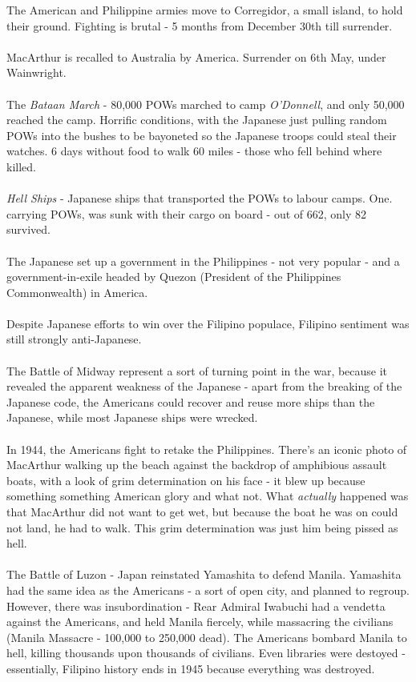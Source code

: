 \documentclass[a4paper]{article}
\begin{document}
\noindent The American and Philippine armies move to Corregidor, a small island, to hold their ground. Fighting is brutal - 5 months from December 30th till surrender.\\
\\
MacArthur is recalled to Australia by America. Surrender on 6th May, under Wainwright.\\
\\
The \textit{Bataan March} - 80,000 POWs marched to camp \textit{O'Donnell}, and only 50,000 reached the camp. Horrific conditions, with the Japanese just pulling random POWs into the bushes to be bayoneted so the Japanese troops could steal their watches. 6 days without food to walk 60 miles - those who fell behind where killed.\\ 
\\
\textit{Hell Ships} - Japanese ships that transported the POWs to labour camps. One. carrying POWs, was sunk with their cargo on board - out of 662, only 82 survived.\\
\\
The Japanese set up a government in the Philippines - not very popular - and a government-in-exile headed by Quezon (President of the Philippines Commonwealth) in America. \\
\\
Despite Japanese efforts to win over the Filipino populace, Filipino sentiment was still strongly anti-Japanese.\\
\\
The Battle of Midway represent a sort of turning point in the war, because it revealed the apparent weakness of the Japanese - apart from the breaking of the Japanese code, the Americans could recover and reuse more ships than the Japanese, while most Japanese ships were wrecked.\\
\\
In 1944, the Americans fight to retake the Philippines. There's an iconic photo of MacArthur walking up the beach against the backdrop of amphibious assault boats, with a look of grim determination on his face - it blew up because something something American glory and what not. What \textit{actually} happened was that MacArthur did not want to get wet, but because the boat he was on could not land, he had to walk. This grim determination was just him being pissed as hell.\\
\\
The Battle of Luzon - Japan reinstated Yamashita to defend Manila. Yamashita had the same idea as the Americans - a sort of open city, and planned to regroup. However, there was insubordination - Rear Admiral Iwabuchi had a vendetta against the Americans, and held Manila fiercely, while massacring the civilians (Manila Massacre - 100,000 to 250,000 dead). The Americans bombard Manila to hell, killing thousands upon thousands of civilians. Even libraries were destoyed - essentially, Filipino history ends in 1945 because everything was destroyed.\\
\end{document}
